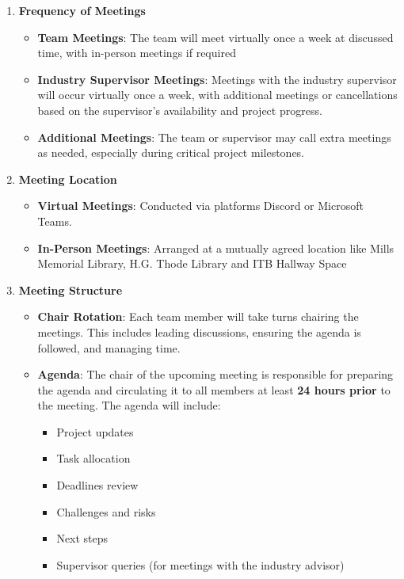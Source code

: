 \documentclass{article}
\begin{document}
\begin{enumerate}[label=\textbf{\arabic*}]
    \item \textbf{Frequency of Meetings}
    \begin{itemize}
        \item \textbf{Team Meetings}: The team will meet virtually once a week at discussed time, with in-person meetings if required
        \item \textbf{Industry Supervisor Meetings}: Meetings with the industry supervisor will occur virtually once a week, with additional meetings or cancellations based on the supervisor's availability and project progress.
        \item \textbf{Additional Meetings}: The team or supervisor may call extra meetings as needed, especially during critical project milestones.
    \end{itemize}
    
    \item \textbf{Meeting Location}
    \begin{itemize}
        \item \textbf{Virtual Meetings}: Conducted via platforms Discord or Microsoft Teams.
        \item \textbf{In-Person Meetings}: Arranged at a mutually agreed location like Mills Memorial Library, H.G. Thode Library and ITB Hallway Space 
    \end{itemize}

    \item \textbf{Meeting Structure}
    \begin{itemize}
    \item \textbf{Chair Rotation}: Each team member will take turns chairing the meetings. This includes leading discussions, ensuring the agenda is followed, and managing time.
    \item \textbf{Agenda}: The chair of the upcoming meeting is responsible for preparing the agenda and circulating it to all members at least \textbf{24 hours prior} to the meeting. The agenda will include:
    \begin{itemize}
        \item Project updates
        \item Task allocation
        \item Deadlines review
        \item Challenges and risks
        \item Next steps
        \item Supervisor queries (for meetings with the industry advisor)
    \end{itemize}
    \end{itemize}


\end{enumerate}
\end{document}
